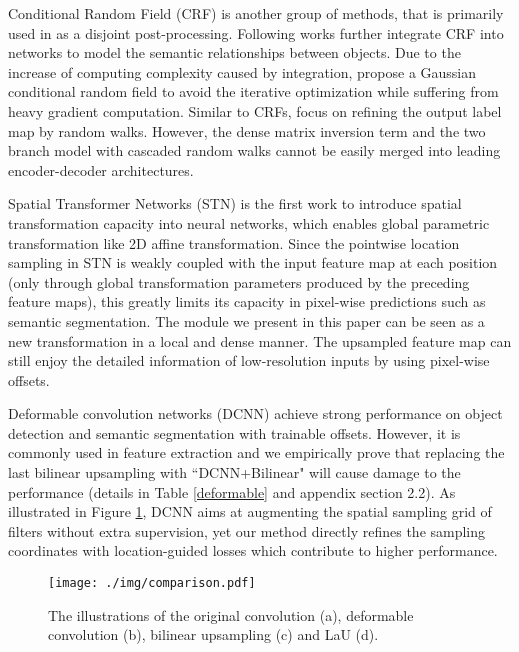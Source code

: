 \documentclass[10pt,twocolumn,letterpaper]{article}
\begin{document}
Conditional Random Field (CRF) is another group of methods, that is primarily used in \cite{ChenPKMY14} as a disjoint post-processing. Following works \cite{LinSHR16, VemulapalliT0C16, LiuLLLT15} further integrate CRF into networks to model the semantic relationships between objects. Due to the increase of computing complexity caused by integration, \cite{ChandraK16, ChandraUK17} propose a Gaussian conditional random field to avoid the iterative optimization \cite{0001JRVSDHT15} while suffering from heavy gradient computation. Similar to CRFs, \cite{BertasiusTYS17, JiangGWTC18} focus on refining the output label map by random walks. However, the dense matrix inversion term and the two branch model with cascaded random walks cannot be easily merged into leading encoder-decoder architectures.

Spatial Transformer Networks (STN) \cite{JaderbergSZK15} is the first work to introduce spatial transformation capacity into neural networks, which enables global parametric transformation like 2D affine transformation. Since the pointwise location sampling in STN is weakly coupled with the input feature map at each position (only through global transformation parameters produced by the preceding feature maps), this greatly limits its capacity in pixel-wise predictions such as semantic segmentation. The module we present in this paper can be seen as a new transformation in a local and dense manner. The upsampled feature map can still enjoy the detailed information of low-resolution inputs by using pixel-wise offsets.

Deformable convolution networks (DCNN) \cite{DaiQXLZHW17, ZhuHLD19} achieve strong performance on object detection and semantic segmentation with trainable offsets. However, it is commonly used in feature extraction and we empirically prove that replacing the last bilinear upsampling with ``DCNN+Bilinear" will cause damage to the performance (details in Table \ref{deformable} and appendix section 2.2). As illustrated in Figure \ref{DCNN}, DCNN aims at augmenting the spatial sampling grid of filters  without extra supervision, yet our method directly refines the sampling coordinates with location-guided losses which contribute to higher performance.

\begin{figure}[t]
  \centering
  \texttt{[image: ./img/comparison.pdf]} 
\caption{The illustrations of the original convolution (a), deformable convolution \cite{DaiQXLZHW17} (b), bilinear upsampling (c) and LaU (d).}
\label{DCNN}
\end{figure}
\end{document}
